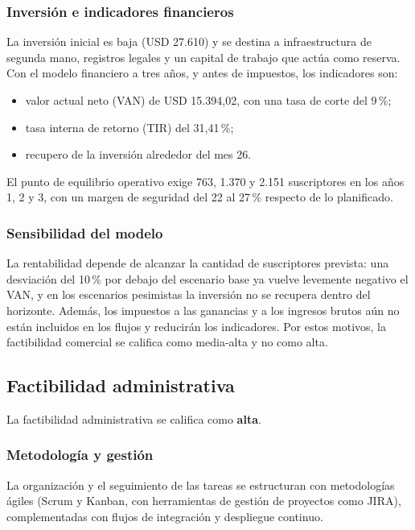 \subsubsection{Inversión e indicadores financieros}
La inversión inicial es baja (USD 27.610) y se destina a infraestructura de segunda mano, registros legales y un capital de trabajo que actúa como reserva. Con el modelo financiero a tres años, y antes de impuestos, los indicadores son:
\begin{itemize}
  \item valor actual neto (VAN) de USD 15.394,02, con una tasa de corte del 9\,\%;
  \item tasa interna de retorno (TIR) del 31,41\,\%;
  \item recupero de la inversión alrededor del mes 26.
\end{itemize}
El punto de equilibrio operativo exige 763, 1.370 y 2.151 suscriptores en los años 1, 2 y 3, con un margen de seguridad del 22 al 27\,\% respecto de lo planificado.

\subsubsection{Sensibilidad del modelo}
La rentabilidad depende de alcanzar la cantidad de suscriptores prevista: una desviación del 10\,\% por debajo del escenario base ya vuelve levemente negativo el VAN, y en los escenarios pesimistas la inversión no se recupera dentro del horizonte. Además, los impuestos a las ganancias y a los ingresos brutos aún no están incluidos en los flujos y reducirán los indicadores. Por estos motivos, la factibilidad comercial se califica como media-alta y no como alta.

\subsection{Factibilidad administrativa}
La factibilidad administrativa se califica como \textbf{alta}.

\subsubsection{Metodología y gestión}
La organización y el seguimiento de las tareas se estructuran con metodologías ágiles (Scrum y Kanban, con herramientas de gestión de proyectos como JIRA), complementadas con flujos de integración y despliegue continuo.

